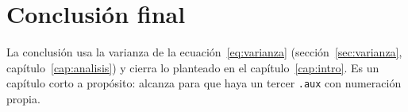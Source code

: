 \chapter{Conclusión final}\label{cap:conclusion}

La conclusión usa la varianza de la ecuación~\eqref{eq:varianza} (sección~\ref{sec:varianza}, capítulo~\ref{cap:analisis}) y cierra lo planteado en el capítulo~\ref{cap:intro}. Es un capítulo corto a propósito: alcanza para que haya un tercer \verb|.aux| con numeración propia.
